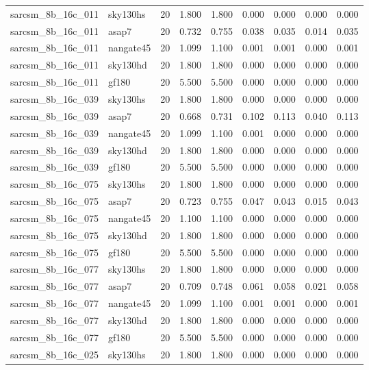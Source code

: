 \begin{tabular}{llrrrrrrr}
sarcsm\_8b\_16c\_011 & sky130hs & 20 & 1.800 & 1.800 & 0.000 & 0.000 & 0.000 & 0.000 \\
sarcsm\_8b\_16c\_011 & asap7 & 20 & 0.732 & 0.755 & 0.038 & 0.035 & 0.014 & 0.035 \\
sarcsm\_8b\_16c\_011 & nangate45 & 20 & 1.099 & 1.100 & 0.001 & 0.001 & 0.000 & 0.001 \\
sarcsm\_8b\_16c\_011 & sky130hd & 20 & 1.800 & 1.800 & 0.000 & 0.000 & 0.000 & 0.000 \\
sarcsm\_8b\_16c\_011 & gf180 & 20 & 5.500 & 5.500 & 0.000 & 0.000 & 0.000 & 0.000 \\
sarcsm\_8b\_16c\_039 & sky130hs & 20 & 1.800 & 1.800 & 0.000 & 0.000 & 0.000 & 0.000 \\
sarcsm\_8b\_16c\_039 & asap7 & 20 & 0.668 & 0.731 & 0.102 & 0.113 & 0.040 & 0.113 \\
sarcsm\_8b\_16c\_039 & nangate45 & 20 & 1.099 & 1.100 & 0.001 & 0.000 & 0.000 & 0.000 \\
sarcsm\_8b\_16c\_039 & sky130hd & 20 & 1.800 & 1.800 & 0.000 & 0.000 & 0.000 & 0.000 \\
sarcsm\_8b\_16c\_039 & gf180 & 20 & 5.500 & 5.500 & 0.000 & 0.000 & 0.000 & 0.000 \\
sarcsm\_8b\_16c\_075 & sky130hs & 20 & 1.800 & 1.800 & 0.000 & 0.000 & 0.000 & 0.000 \\
sarcsm\_8b\_16c\_075 & asap7 & 20 & 0.723 & 0.755 & 0.047 & 0.043 & 0.015 & 0.043 \\
sarcsm\_8b\_16c\_075 & nangate45 & 20 & 1.100 & 1.100 & 0.000 & 0.000 & 0.000 & 0.000 \\
sarcsm\_8b\_16c\_075 & sky130hd & 20 & 1.800 & 1.800 & 0.000 & 0.000 & 0.000 & 0.000 \\
sarcsm\_8b\_16c\_075 & gf180 & 20 & 5.500 & 5.500 & 0.000 & 0.000 & 0.000 & 0.000 \\
sarcsm\_8b\_16c\_077 & sky130hs & 20 & 1.800 & 1.800 & 0.000 & 0.000 & 0.000 & 0.000 \\
sarcsm\_8b\_16c\_077 & asap7 & 20 & 0.709 & 0.748 & 0.061 & 0.058 & 0.021 & 0.058 \\
sarcsm\_8b\_16c\_077 & nangate45 & 20 & 1.099 & 1.100 & 0.001 & 0.001 & 0.000 & 0.001 \\
sarcsm\_8b\_16c\_077 & sky130hd & 20 & 1.800 & 1.800 & 0.000 & 0.000 & 0.000 & 0.000 \\
sarcsm\_8b\_16c\_077 & gf180 & 20 & 5.500 & 5.500 & 0.000 & 0.000 & 0.000 & 0.000 \\
sarcsm\_8b\_16c\_025 & sky130hs & 20 & 1.800 & 1.800 & 0.000 & 0.000 & 0.000 & 0.000 \\

\end{tabular}
